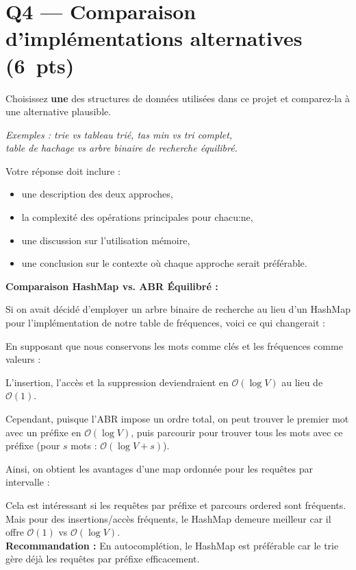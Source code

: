 \documentclass[12pt,a4paper]{article}
\newcommand{\pts}[1]{\hfill\textbf{\small(#1~pts)}}
\newcommand{\answerspace}[1]{\vspace{#1}}
\begin{document}
\answerspace{8em}

\newpage

\section{Q4 — Comparaison d'implémentations alternatives \pts{6}}

Choisissez \textbf{une} des structures de données utilisées dans ce projet et
comparez-la à une alternative plausible.

\textit{Exemples : trie vs tableau trié, tas min vs tri complet,}\\
\textit{table de hachage vs arbre binaire de recherche équilibré.}

Votre réponse doit inclure :
\begin{itemize}
  \item une description des deux approches,
  \item la complexité des opérations principales pour chacu:ne,
  \item une discussion sur l'utilisation mémoire,
  \item une conclusion sur le contexte où chaque approche serait préférable.
\end{itemize}


\textbf{Comparaison HashMap vs. ABR Équilibré :}

Si on avait décidé d'employer un arbre binaire de recherche au lieu d'un HashMap pour l'implémentation de notre table de fréquences, voici ce qui changerait :

En supposant que nous conservons les mots comme clés et les fréquences comme valeurs :

L'insertion, l'accès et la suppression deviendraient en $\mathcal{O}(\log V)$ au lieu de $\mathcal{O}(1)$.

Cependant, puisque l'ABR impose un ordre total, on peut trouver le premier mot avec un préfixe en $\mathcal{O}(\log V)$, puis parcourir pour trouver tous les mots avec ce préfixe (pour $s$ mots : $\mathcal{O}(\log V + s)$).

Ainsi, on obtient les avantages d'une map ordonnée pour les requêtes par intervalle :

Cela est intéressant si les requêtes par préfixe et parcours ordered sont fréquents. Mais pour des insertions/accès fréquents, le HashMap demeure meilleur car il offre $\mathcal{O}(1)$ vs $\mathcal{O}(\log V)$. \\[6pt]
\textbf{Recommandation :} En autocomplétion, le HashMap est préférable car le trie gère déjà les requêtes par préfixe efficacement.
\answerspace{12em}
\end{document}
